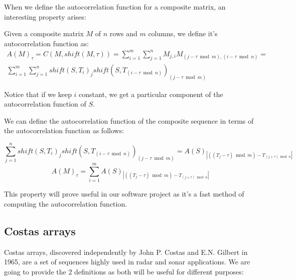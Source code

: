 When we define the autocorrelation function for a composite matrix, an
interesting property arises:

\begin{definition}
  Given a composite matrix $M$ of $n$ rows and $m$ columns, we define it's
  autocorrelation function as:
  \begin{equation}
    \begin{split}
      A(M)_{\tau} = C(M, shift(M, \tau)) = \sum_{i=1}^{m}\sum_{j=1}^{n}M_{j, i}M_{(j-\tau \bmod m),(i - \tau \bmod n)} = \\
      \sum_{i=1}^{m}\sum_{j=1}^{n}shift(S, T_{i})_{j}shift(S, T_{(i - \tau \bmod n)})_{(j-\tau \bmod m)}
    \end{split}
  \end{equation}
\end{definition}

Notice that if we keep $i$ constant, we get a particular component of the
autocorrelation function of $S$.

\begin{property} \label{composition:prop:1}
We can define the autocorrelation function of the composite
sequence in terms of the autocorrelation function as follows:

\begin{equation}
  \sum_{j=1}^{n}shift(S, T_{i})_{j}shift(S, T_{(i - \tau \bmod n)})_{(j-\tau \bmod m)} = A(S)_{|((T_{j} - \tau) \bmod m) - T_{(j + \tau) \bmod n}|}
\end{equation}
\begin{equation}
  A(M)_{\tau} = \sum_{i=1}^{m} A(S)_{|((T_{j} - \tau) \bmod m) - T_{(j + \tau) \bmod n}|}
\end{equation}

\end{property}

This property will prove useful in our software project as it's a fast method
of computing the autocorrelation function.

\subsection{Costas arrays}

Costas arrays, discovered independently by John P. Costas\cite{costas_costas}
and E.N. Gilbert \cite{gilbert_costas} in 1965, are a set of sequences highly
used in radar and sonar applications. We are going to provide the 2 definitions
as both will be useful for different purposes:

